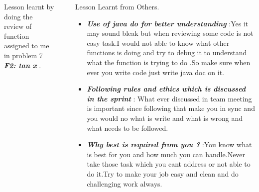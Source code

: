 \documentclass[final]{beamer}
\newlength{\sepwid}
\newlength{\onecolwid}
\newlength{\twocolwid}
\begin{document}
\begin{frame}[t]
\begin{columns}[t]
\begin{column}{\twocolwid}
\begin{columns}[t,totalwidth=\twocolwid]
\begin{column}{\onecolwid}
\begin{block}{ Lesson learnt by doing the review of function assigned to me in problem 7  \textbf{\textit{F2: tan x}} .}
\end{block}


\end{column} %

\end{columns} %

\end{column} %

\begin{column}{\sepwid}\end{column} %

\begin{column}{\onecolwid} %


\begin{block}{Lesson Learnt from Others.}
\begin{itemize}
\item  \textit{\textbf{Use of java do for better understanding}} :Yes it may sound bleak but when reviewing some code is not easy task.I would not able to know what other functions is doing and try to debug it to understand what the function is trying to do .So make sure when ever you write code just write java doc on it.
\item  \textit{\textbf{Following rules and ethics which is discussed in the sprint }} : What ever discussed in team meeting is important since following that make you in sync and you would no what is write and what is wrong and what needs to be followed.
\item \textit{\textbf{Why best is required from you ?}} :You know what is best for you and how much you can handle.Never take those task which you cant address or not able to do it.Try to make your job easy and clean and do challenging work always.  
\end{itemize}

\end{block}




\end{column}
\end{columns}
\end{frame}
\end{document}
